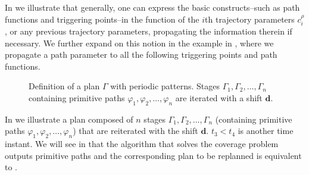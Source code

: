 In  we illustrate that generally, one can express the basic constructs--such as path functions and triggering points--in the function of the $i$th trajectory parameters $c_{i}^{\rho}$, or any previous trajectory parameters, propagating the information therein if necessary. We further expand on this notion in the example in , where we propagate a path parameter to all the following triggering points and path functions.

\begin{figure}[h!]
  \center
  \caption[Definition of a plan with a loop]{Definition of a plan $\Gamma$ with periodic patterns. Stages $\Gamma_1,\Gamma_2,\dots,\Gamma_n$ containing primitive paths $\varphi_1,\varphi_2,\dots,\varphi_n$ are iterated with a shift $\mathbf{d}$.}
  \label{fig:state-machine-loop}
\end{figure}
In  we illustrate a plan composed of $n$ stages $\Gamma_1,\Gamma_2,\dots,\Gamma_n$ (containing primitive paths $\varphi_1,\varphi_2,\dots,\varphi_n$) that are reiterated with the shift $\mathbf{d}$. $t_3<t_4$ is another time instant. We will see in  that the algorithm that solves the coverage problem outputs primitive paths and the corresponding plan to be replanned is equivalent to . 

